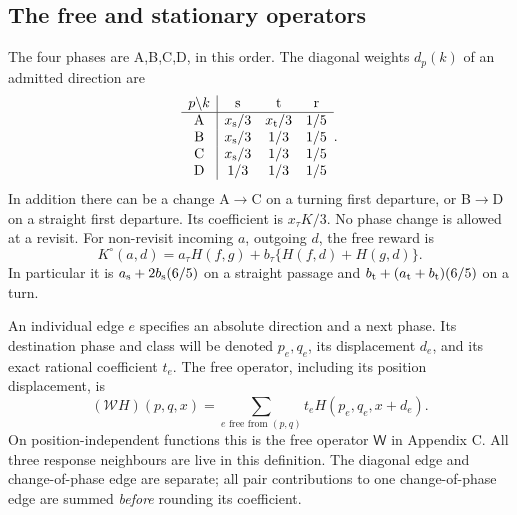 \subsection{The free and stationary operators}

The four phases are A,B,C,D, in this order.  The diagonal weights
$d_p(k)$ of an admitted direction are
\begin{equation}\label{hl:diagonals}
\begin{array}{c|ccc}
 p\backslash k&\mathrm s&\mathrm t&\mathrm r\\\hline
 \mathrm A&x_{\rm s}/3&x_{\rm t}/3&1/5\\
 \mathrm B&x_{\rm s}/3&1/3&1/5\\
 \mathrm C&x_{\rm s}/3&1/3&1/5\\
 \mathrm D&1/3&1/3&1/5
\end{array}.
\end{equation}
In addition there can be a change A$\to$C on a turning first
departure, or B$\to$D on a straight first departure.  Its coefficient
is $x_\tau K/3$.  No phase change is allowed at a revisit.  For
non-revisit incoming $a$, outgoing $d$, the free reward is
\begin{equation}\label{hl:freereward}
 K^\circ(a,d)=a_\tau H(f,g)+b_\tau\{H(f,d)+H(g,d)\}.
\end{equation}
In particular it is
$a_{\rm s}+2b_{\rm s}(6/5)$ on a straight passage and
$b_{\rm t}+(a_{\rm t}+b_{\rm t})(6/5)$ on a turn.

An individual edge $e$ specifies an absolute direction and a next
phase.  Its destination phase and class will be denoted $p_e,q_e$,
its displacement $d_e$, and its exact rational coefficient $t_e$.
The free operator, including its position displacement, is
\begin{equation}\label{hl:free}
 (\mathcal W H)(p,q,x)=\sum_{e\text{ free from }(p,q)}
                         t_e H(p_e,q_e,x+d_e).
\end{equation}
On position-independent functions this is the free operator
$\mathsf W$ in Appendix C.  All three response neighbours are live
in this definition.  The diagonal edge and change-of-phase edge
are separate; all pair contributions to one change-of-phase edge
are summed \emph{before} rounding its coefficient.


